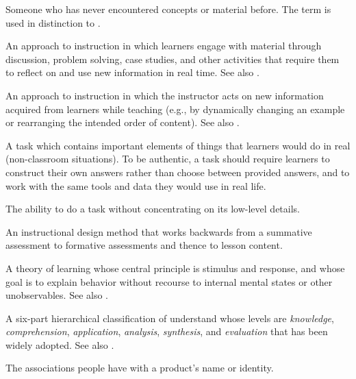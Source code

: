 
\begin{description}

 Someone who has never
encountered concepts or material before. The term is used in distinction to
.

 An approach to instruction in which
learners engage with material through discussion, problem solving, case studies,
and other activities that require them to reflect on and use new information in
real time.  See also .

 An approach to instruction in which the
instructor acts on new information acquired from learners while teaching (e.g.,
by dynamically changing an example or rearranging the intended order of
content).  See also .

 A task which contains important
elements of things that learners would do in real (non-classroom situations). To
be authentic, a task should require learners to construct their own answers
rather than choose between provided answers, and to work with the same tools and
data they would use in real life.

 The ability to do a task without
concentrating on its low-level details.

 An instructional design method that
works backwards from a summative assessment to formative assessments and thence
to lesson content.

 A theory of learning whose central principle
is stimulus and response, and whose goal is to explain behavior without recourse
to internal mental states or other unobservables. See
also .

 A six-part hierarchical
classification of understand whose levels are \emph{knowledge},
\emph{comprehension}, \emph{application}, \emph{analysis}, \emph{synthesis}, and
\emph{evaluation} that has been widely adopted. See also
.

 The associations people have with a product's name or
identity.


\end{description}

